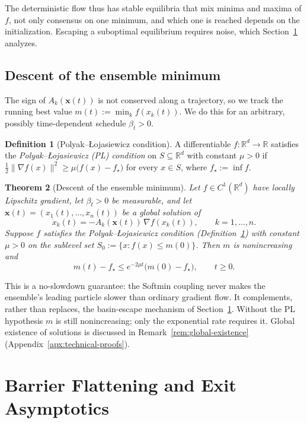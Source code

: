 \documentclass{article} %
\theoremstyle{plain}
\newtheorem{theorem}{Theorem}[section]
\theoremstyle{definition}
\newtheorem{definition}[theorem]{Definition}
\theoremstyle{remark}
\newcommand{\prefactor}[2]{A_{#1}(#2)}
\newcommand{\xx}{\mathbf{x}}
\newcommand{\R}{\mathbb{R}}
\begin{document}
The deterministic flow thus has stable equilibria that mix minima and maxima of $f$, not only consensus on one minimum, and which one is reached depends on the initialization. Escaping a suboptimal equilibrium requires noise, which Section~\ref{sec:hitting-times} analyzes.

\subsection{Descent of the ensemble minimum}
\label{sec:convergence-rate}

The sign of $\prefactor{k}{\xx(t)}$ is not conserved along a trajectory, so we track the running best value $m(t):=\min_{k}f(x_k(t))$. We do this for an arbitrary, possibly time-dependent schedule $\beta_t>0$.

\begin{definition}[Polyak--\L{}ojasiewicz condition]
    \label{def:pl-condition}
    A differentiable $f:\R^d\to\R$ satisfies the \textit{Polyak--\L{}ojasiewicz (PL) condition} on $S\subseteq\R^d$ with constant $\mu>0$ if $\tfrac12\|\nabla f(x)\|^2\ge\mu\bigl(f(x)-f_\star\bigr)$ for every $x\in S$, where $f_\star:=\inf f$.
\end{definition}

\begin{theorem}[Descent of the ensemble minimum]
    \label{thm:ensemble-min}
    Let $f\in C^1(\R^d)$ have locally Lipschitz gradient, let $\beta_t>0$ be measurable, and let $\xx(t)=(x_1(t),\dots,x_n(t))$ be a global solution of
    \[
        \dot x_k(t)=-\prefactor{k}{\xx(t)}\,\nabla f(x_k(t)), \qquad k=1,\dots,n.
    \]
    Suppose $f$ satisfies the Polyak--\L{}ojasiewicz condition (Definition~\ref{def:pl-condition}) with constant $\mu>0$ on the sublevel set $S_0:=\{x:f(x)\le m(0)\}$. Then $m$ is nonincreasing and
    \[
        m(t)-f_\star\le e^{-2\mu t}\bigl(m(0)-f_\star\bigr), \qquad t\ge0.
    \]
\end{theorem}

This is a no-slowdown guarantee: the Softmin coupling never makes the ensemble's leading particle slower than ordinary gradient flow. It complements, rather than replaces, the basin-escape mechanism of Section~\ref{sec:hitting-times}. Without the PL hypothesis $m$ is still nonincreasing; only the exponential rate requires it. Global existence of solutions is discussed in Remark~\ref{rem:global-existence} (Appendix~\ref{apx:technical-proofs}).

\section{Barrier Flattening and Exit Asymptotics}
\label{sec:hitting-times}
\label{sec:exit-times}
\end{document}
